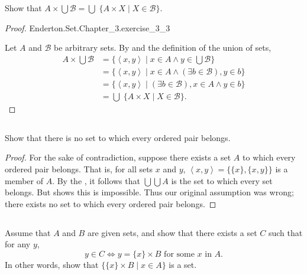 \documentclass{report}
\begin{document}
Show that $A \times \bigcup \mathscr{B} =
  \bigcup\;\{ A \times X \mid X \in \mathscr{B} \}$.

\begin{proof}

    {Enderton.Set.Chapter\_3.exercise\_3\_3}

  Let $A$ and $\mathscr{B}$ be arbitrary sets.
  By  and the definition of the union of sets,
  \begin{align*}
    A \times \bigcup\mathscr{B}
      & = \{ \left< x, y \right> \mid
        x \in A \land y \in \bigcup\mathscr{B} \} \\
      & = \{ \left< x, y \right> \mid
        x \in A \land (\exists b \in \mathscr{B}), y \in b \} \\
      & = \{ \left< x, y \right> \mid
        (\exists b \in \mathscr{B}), x \in A \land y \in b \} \\
      & = \bigcup\; \{ A \times X \mid X \in \mathscr{B} \}.
  \end{align*}

\end{proof}

\subsection{}%
\label{sub:exercise-3.4}

Show that there is no set to which every ordered pair belongs.

\begin{proof}

  For the sake of contradiction, suppose there exists a set $A$ to which every
    ordered pair belongs.
  That is, for all sets $x$ and $y$, $\left< x, y \right> = \{\{x\}, \{x, y\}\}$
    is a member of $A$.
  By the , it follows that $\bigcup\bigcup A$ is the
    set to which every set belongs.
  But  shows this is impossible.
  Thus our original assumption was wrong; there exists no set to which every
    ordered pair belongs.

\end{proof}

\subsection{}%
\label{sub:exercise-3.5a}

Assume that $A$ and $B$ are given sets, and show that there exists a set $C$
  such that for any $y$,
  \begin{equation}
    \label{sub:exercise-3.5a-eq1}
    y \in C \iff y = \{x\} \times B \text{ for some } x \text{ in } A.
  \end{equation}
In other words, show that $\{\{x\} \times B \mid x \in A\}$ is a set.
\end{document}
